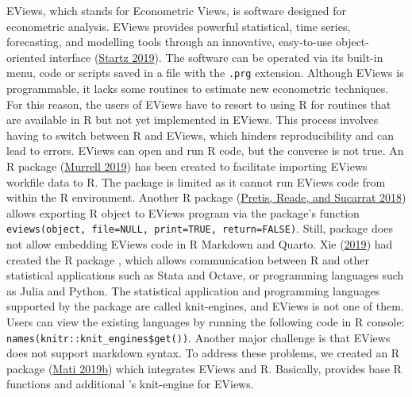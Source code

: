EViews, which stands for Econometric Views, is software designed for econometric analysis. EViews provides powerful statistical, time series, forecasting, and modelling tools through an innovative, easy-to-use object-oriented interface (\protect\hyperlink{ref-Eviews2019}{Startz 2019}). The software can be operated via its built-in menu, code or scripts saved in a file with the \texttt{.prg} extension. Although EViews is programmable, it lacks some routines to estimate new econometric techniques. For this reason, the users of EViews have to resort to using R for routines that are available in R but not yet implemented in EViews. This process involves having to switch between R and EViews, which hinders reproducibility and can lead to errors. EViews can open and run R code, but the converse is not true. An R package  (\protect\hyperlink{ref-paul2019}{Murrell 2019}) has been created to facilitate importing EViews workfile data to R. The package is limited as it cannot run EViews code from within the R environment. Another R package  (\protect\hyperlink{ref-felix2018}{Pretis, Reade, and Sucarrat 2018}) allows exporting R object to EViews program via the package's function \texttt{eviews(object,\ file=NULL,\ print=TRUE,\ return=FALSE)}. Still,  package does not allow embedding EViews code in R Markdown and Quarto. Xie (\protect\hyperlink{ref-xie2019}{2019}) had created the R package , which allows communication between R and other statistical applications such as Stata and Octave, or programming languages such as Julia and Python. The statistical application and programming languages supported by the  package are called knit-engines, and EViews is not one of them. Users can view the existing  languages by running the following code in R console: \texttt{names(knitr::knit\_engines\$get())}. Another major challenge is that EViews does not support markdown syntax. To address these problems, we created an R package  (\protect\hyperlink{ref-Mati2019}{Mati 2019b}) which integrates EViews and R. Basically,  provides base R functions and additional 's knit-engine for EViews.

